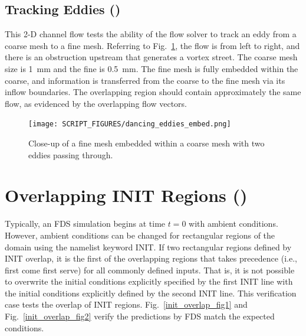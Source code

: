 \documentclass[11pt]{book}
\begin{document}
\subsection{Tracking Eddies (\texorpdfstring{}{dancing\_eddies\_embed})}
\label{dancing_eddies_embed}

This 2-D channel flow tests the ability of the flow solver to track an eddy from a coarse mesh to a fine mesh. Referring to Fig.~\ref{dancing_eddies_embed_fig}, the flow is from left to right, and there is an obstruction upstream that generates a vortex street. The coarse mesh size is 1~mm and the fine is 0.5~mm. The fine mesh is fully embedded within the coarse, and information is transferred from the coarse to the fine mesh via its inflow boundaries. The overlapping region should contain approximately the same flow, as evidenced by the overlapping flow vectors.  

\begin{figure}[!ht]
\texttt{[image: SCRIPT\_FIGURES/dancing\_eddies\_embed.png]} 
\caption[The  test case]{Close-up of a fine mesh embedded within a coarse mesh with two eddies passing through.}
\label{dancing_eddies_embed_fig}
\end{figure}


\section{Overlapping INIT Regions (\texorpdfstring{}{init\_overlap})}
\label{init_overlap}

Typically, an FDS simulation begins at time $t=0$ with ambient conditions. However, ambient conditions can be changed for rectangular regions of the domain using the namelist keyword {\ct INIT}. If two rectangular regions defined by {\ct INIT} overlap, it is the first of the overlapping regions that takes precedence (i.e., first come first serve) for all commonly defined inputs. That is, it is not possible to overwrite the initial conditions explicitly specified by the first {\ct INIT} line with the initial conditions explicitly defined by the second {\ct INIT} line. This verification case tests the overlap of {\ct INIT} regions. Fig.~\ref{init_overlap_fig1} and Fig.~\ref{init_overlap_fig2} verify the predictions by FDS match the expected conditions.
\end{document}
